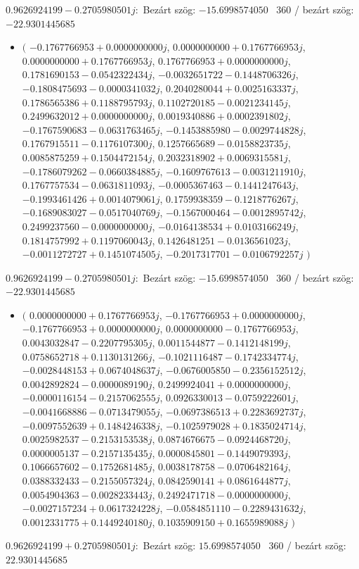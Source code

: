 \documentclass[14pt,a4paper]{article}
\begin{document}
$0.9626924199-0.2705980501j$:\
Bezárt szög: $-15.6998574050$ \
360 / bezárt szög: $-22.9301445685$\
\begin{itemize}
\item
$\big($
$-0.1767766953+0.0000000000j$, $0.0000000000+0.1767766953j$, $0.0000000000+0.1767766953j$, $0.1767766953+0.0000000000j$, $0.1781690153-0.0542322434j$, $-0.0032651722-0.1448706326j$, $-0.1808475693-0.0000341032j$, $0.2040280044+0.0025163337j$, $0.1786565386+0.1188795793j$, $0.1102720185-0.0021234145j$, $0.2499632012+0.0000000000j$, $0.0019340886+0.0002391802j$, $-0.1767590683-0.0631763465j$, $-0.1453885980-0.0029744828j$, $0.1767915511-0.1176107300j$, $0.1257665689-0.0158823735j$, $0.0085875259+0.1504472154j$, $0.2032318902+0.0069315581j$, $-0.1786079262-0.0660384885j$, $-0.1609767613-0.0031211910j$, $0.1767757534-0.0631811093j$, $-0.0005367463-0.1441247643j$, $-0.1993461426+0.0014079061j$, $0.1759938359-0.1218776267j$, $-0.1689083027-0.0517040769j$, $-0.1567000464-0.0012895742j$, $0.2499237560-0.0000000000j$, $-0.0164138534+0.0103166249j$, $0.1814757992+0.1197060043j$, $0.1426481251-0.0136561023j$, $-0.0011272727+0.1451074505j$, $-0.2017317701-0.0106792257j$
$\big)$
\end{itemize}
$0.9626924199-0.2705980501j$:\
Bezárt szög: $-15.6998574050$ \
360 / bezárt szög: $-22.9301445685$\
\begin{itemize}
\item
$\big($
$0.0000000000+0.1767766953j$, $-0.1767766953+0.0000000000j$, $-0.1767766953+0.0000000000j$, $0.0000000000-0.1767766953j$, $0.0043032847-0.2207795305j$, $0.0011544877-0.1412148199j$, $0.0758652718+0.1130131266j$, $-0.1021116487-0.1742334774j$, $-0.0028448153+0.0674048637j$, $-0.0676005850-0.2356152512j$, $0.0042892824-0.0000089190j$, $0.2499924041+0.0000000000j$, $-0.0000116154-0.2157062555j$, $0.0926330013-0.0759222601j$, $-0.0041668886-0.0713479055j$, $-0.0697386513+0.2283692737j$, $-0.0097552639+0.1484246338j$, $-0.1025979028+0.1835024714j$, $0.0025982537-0.2153153538j$, $0.0874676675-0.0924468720j$, $0.0000005137-0.2157135435j$, $0.0000845801-0.1449079393j$, $0.1066657602-0.1752681485j$, $0.0038178758-0.0706482164j$, $0.0388332433-0.2155057324j$, $0.0842590141+0.0861644877j$, $0.0054904363-0.0028233443j$, $0.2492471718-0.0000000000j$, $-0.0027157234+0.0617324228j$, $-0.0584851110-0.2289431632j$, $0.0012331775+0.1449240180j$, $0.1035909150+0.1655989088j$
$\big)$
\end{itemize}
$0.9626924199+0.2705980501j$:\
Bezárt szög: $15.6998574050$ \
360 / bezárt szög: $22.9301445685$\
\end{document}
